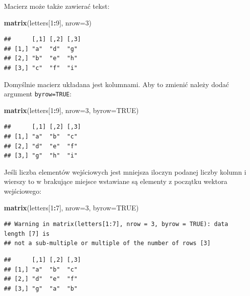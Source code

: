 \documentclass[]{book}
\newenvironment{Shaded}{\begin{snugshade}}{\end{snugshade}}
\newcommand{\KeywordTok}[1]{\textcolor[rgb]{0.13,0.29,0.53}{\textbf{#1}}}
\newcommand{\DataTypeTok}[1]{\textcolor[rgb]{0.13,0.29,0.53}{#1}}
\newcommand{\DecValTok}[1]{\textcolor[rgb]{0.00,0.00,0.81}{#1}}
\newcommand{\OtherTok}[1]{\textcolor[rgb]{0.56,0.35,0.01}{#1}}
\newcommand{\OperatorTok}[1]{\textcolor[rgb]{0.81,0.36,0.00}{\textbf{#1}}}
\newcommand{\NormalTok}[1]{#1}
\begin{document}
Macierz może także zawierać tekst:

\begin{Shaded}
\begin{Highlighting}[]
\KeywordTok{matrix}\NormalTok{(letters[}\DecValTok{1}\OperatorTok{:}\DecValTok{9}\NormalTok{], }\DataTypeTok{nrow=}\DecValTok{3}\NormalTok{)}
\end{Highlighting}
\end{Shaded}

\begin{verbatim}
##      [,1] [,2] [,3]
## [1,] "a"  "d"  "g" 
## [2,] "b"  "e"  "h" 
## [3,] "c"  "f"  "i"
\end{verbatim}

Domyślnie macierz układana jest kolumnami. Aby to zmienić należy dodać
argument \texttt{byrow=TRUE}:

\begin{Shaded}
\begin{Highlighting}[]
\KeywordTok{matrix}\NormalTok{(letters[}\DecValTok{1}\OperatorTok{:}\DecValTok{9}\NormalTok{], }\DataTypeTok{nrow=}\DecValTok{3}\NormalTok{, }\DataTypeTok{byrow=}\OtherTok{TRUE}\NormalTok{)}
\end{Highlighting}
\end{Shaded}

\begin{verbatim}
##      [,1] [,2] [,3]
## [1,] "a"  "b"  "c" 
## [2,] "d"  "e"  "f" 
## [3,] "g"  "h"  "i"
\end{verbatim}

Jeśli liczba elementów wejściowych jest mniejsza iloczyn podanej liczby
kolumn i wierszy to w brakujące miejsce wstawiane są elementy z początku
wektora wejściowego:

\begin{Shaded}
\begin{Highlighting}[]
\KeywordTok{matrix}\NormalTok{(letters[}\DecValTok{1}\OperatorTok{:}\DecValTok{7}\NormalTok{], }\DataTypeTok{nrow=}\DecValTok{3}\NormalTok{, }\DataTypeTok{byrow=}\OtherTok{TRUE}\NormalTok{)}
\end{Highlighting}
\end{Shaded}

\begin{verbatim}
## Warning in matrix(letters[1:7], nrow = 3, byrow = TRUE): data length [7] is
## not a sub-multiple or multiple of the number of rows [3]
\end{verbatim}

\begin{verbatim}
##      [,1] [,2] [,3]
## [1,] "a"  "b"  "c" 
## [2,] "d"  "e"  "f" 
## [3,] "g"  "a"  "b"
\end{verbatim}
\end{document}
